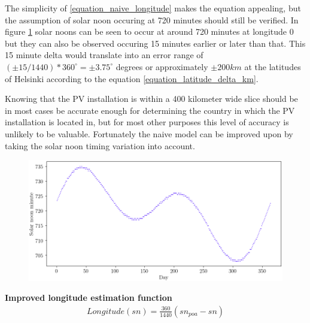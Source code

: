 \hfill \break


\noindent The simplicity of \ref{equation_naive_longitude} makes the equation appealing, but the assumption of solar noon occuring at 720 minutes should still be verified. In figure \ref{fig_solarnoons} solar noons can be seen to occur at around 720 minutes at longitude 0 but they can also be observed occuring 15 minutes earlier or later than that. This 15 minute delta would translate into an error range of $(\pm 15/1440)*360^\circ = \pm 3.75^\circ$ degrees or approximately $\pm 200 km$ at the latitudes of Helsinki according to the equation \ref{equation_latitude_delta_km}.


Knowing that the PV installation is within a 400 kilometer wide slice should be in most cases be accurate enough for determining the country in which the PV installation is located in, but for most other purposes this level of accuracy is unlikely to be valuable. Fortunately the naive model can be improved upon by taking the solar noon timing variation into account. \hfill \break

\begin{figure}[ht!]
\centering
\includegraphics[width=1\linewidth]{pics/solarnoons2}
\label{fig_solarnoons}
\end{figure}



\newpage
\noindent\textbf{Improved longitude estimation function }
%
\begin{equation}
\begin{split}
\label{equation_longitude_estimation_2}
Longitude(sn)= \frac{360}{1440}(sn_{poa}-sn)
\end{split}
\end{equation}

